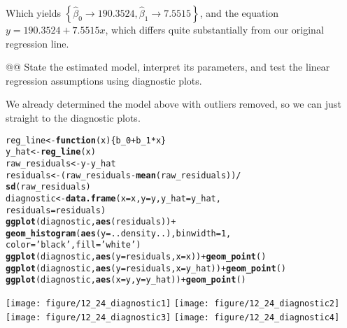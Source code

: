 \documentclass[10pt]{article}\usepackage[]{graphicx}\usepackage[]{xcolor}
\makeatletter
\newcommand{\hlnum}[1]{\textcolor[rgb]{0.686,0.059,0.569}{#1}}%
\newcommand{\hlstr}[1]{\textcolor[rgb]{0.192,0.494,0.8}{#1}}%
\newcommand{\hlopt}[1]{\textcolor[rgb]{0,0,0}{#1}}%
\newcommand{\hlstd}[1]{\textcolor[rgb]{0.345,0.345,0.345}{#1}}%
\newcommand{\hlkwa}[1]{\textcolor[rgb]{0.161,0.373,0.58}{\textbf{#1}}}%
\newcommand{\hlkwb}[1]{\textcolor[rgb]{0.69,0.353,0.396}{#1}}%
\newcommand{\hlkwc}[1]{\textcolor[rgb]{0.333,0.667,0.333}{#1}}%
\newcommand{\hlkwd}[1]{\textcolor[rgb]{0.737,0.353,0.396}{\textbf{#1}}}%
\newenvironment{kframe}{%
 \def\at@end@of@kframe{}%
 \ifinner\ifhmode%
  \def\at@end@of@kframe{\end{minipage}}%
  \begin{minipage}{\columnwidth}%
 \fi\fi%
 \def\FrameCommand##1{\hskip\@totalleftmargin \hskip-\fboxsep
 \colorbox{shadecolor}{##1}\hskip-\fboxsep
     \hskip-\linewidth \hskip-\@totalleftmargin \hskip\columnwidth}%
 \MakeFramed {\advance\hsize-\width
   \@totalleftmargin\z@ \linewidth\hsize
   \@setminipage}}%
 {\par\unskip\endMakeFramed%
 \at@end@of@kframe}
\newenvironment{knitrout}{}{} %
\makeatother
\begin{document}
\begin{easylist}[enumerate]
    Which yields $\boxed{\left\{ \hat{\beta}_0 \to 190.3524, \hat{\beta}_1 \to 7.5515 \right\}}$, and the
    equation $y = 190.3524 + 7.5515 x$, which differs quite substantially from our original regression line.

    @@ State the estimated model, interpret its parameters, and test the linear regression assumptions using diagnostic
    plots.\newline

    We already determined the model above with outliers removed, so we can just straight to the diagnostic plots.

\begin{knitrout}
\color{fgcolor}\begin{kframe}
\begin{alltt}
         \hlstd{reg_line} \hlkwb{<-} \hlkwa{function}\hlstd{(}\hlkwc{x}\hlstd{) \{ b_0} \hlopt{+} \hlstd{b_1} \hlopt{*} \hlstd{x \}}
         \hlstd{y_hat} \hlkwb{<-} \hlkwd{reg_line}\hlstd{(x)}
         \hlstd{raw_residuals} \hlkwb{<-} \hlstd{y} \hlopt{-} \hlstd{y_hat}
         \hlstd{residuals} \hlkwb{<-} \hlstd{(raw_residuals} \hlopt{-} \hlkwd{mean}\hlstd{(raw_residuals))} \hlopt{/}
                         \hlkwd{sd}\hlstd{(raw_residuals)}
         \hlstd{diagnostic} \hlkwb{<-} \hlkwd{data.frame}\hlstd{(}\hlkwc{x}\hlstd{=x,} \hlkwc{y}\hlstd{=y,} \hlkwc{y_hat}\hlstd{=y_hat,}
                                  \hlkwc{residuals}\hlstd{=residuals)}
         \hlkwd{ggplot}\hlstd{(diagnostic,} \hlkwd{aes}\hlstd{(residuals))} \hlopt{+}
             \hlkwd{geom_histogram}\hlstd{(}\hlkwd{aes}\hlstd{(}\hlkwc{y}\hlstd{=..density..),} \hlkwc{binwidth}\hlstd{=}\hlnum{1}\hlstd{,}
                            \hlkwc{color}\hlstd{=}\hlstr{'black'}\hlstd{,} \hlkwc{fill}\hlstd{=}\hlstr{'white'}\hlstd{)}
         \hlkwd{ggplot}\hlstd{(diagnostic,} \hlkwd{aes}\hlstd{(}\hlkwc{y}\hlstd{=residuals,} \hlkwc{x}\hlstd{=x))} \hlopt{+} \hlkwd{geom_point}\hlstd{()}
         \hlkwd{ggplot}\hlstd{(diagnostic,} \hlkwd{aes}\hlstd{(}\hlkwc{y}\hlstd{=residuals,} \hlkwc{x}\hlstd{=y_hat))} \hlopt{+} \hlkwd{geom_point}\hlstd{()}
         \hlkwd{ggplot}\hlstd{(diagnostic,} \hlkwd{aes}\hlstd{(}\hlkwc{x}\hlstd{=y,} \hlkwc{y}\hlstd{=y_hat))} \hlopt{+} \hlkwd{geom_point}\hlstd{()}
\end{alltt}
\end{kframe}

{\centering \texttt{[image: figure/12\_24\_diagnostic1]} 
\texttt{[image: figure/12\_24\_diagnostic2]} 
\texttt{[image: figure/12\_24\_diagnostic3]} 
\texttt{[image: figure/12\_24\_diagnostic4]} 

}
\end{knitrout}
\end{easylist}
\end{document}
